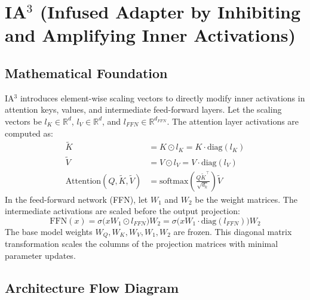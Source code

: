 \documentclass{article}
\begin{document}
\newpage
\section{IA$^3$ (Infused Adapter by Inhibiting and Amplifying Inner Activations)}

\subsection{Mathematical Foundation}
IA$^3$ introduces element-wise scaling vectors to directly modify inner activations in attention keys, values, and intermediate feed-forward layers. Let the scaling vectors be $l_K \in \mathbb{R}^d$, $l_V \in \mathbb{R}^d$, and $l_{FFN} \in \mathbb{R}^{d_{FFN}}$.
The attention layer activations are computed as:
\begin{align}
  \tilde{K} &= K \odot l_K = K \cdot \text{diag}(l_K) \\
  \tilde{V} &= V \odot l_V = V \cdot \text{diag}(l_V) \\
  \text{Attention}(Q, \tilde{K}, \tilde{V}) &= \text{softmax}\left( \frac{Q \tilde{K}^\top}{\sqrt{d_k}} \right) \tilde{V}
\end{align}
In the feed-forward network (FFN), let $W_1$ and $W_2$ be the weight matrices. The intermediate activations are scaled before the output projection:
\begin{equation}
  \text{FFN}(x) = \sigma\bigl(x W_1 \odot l_{FFN}\bigr) W_2 = \sigma\bigl(x W_1 \cdot \text{diag}(l_{FFN})\bigr) W_2
\end{equation}
The base model weights $W_Q, W_K, W_V, W_1, W_2$ are frozen. This diagonal matrix transformation scales the columns of the projection matrices with minimal parameter updates.

\subsection{Architecture Flow Diagram}
\end{document}
